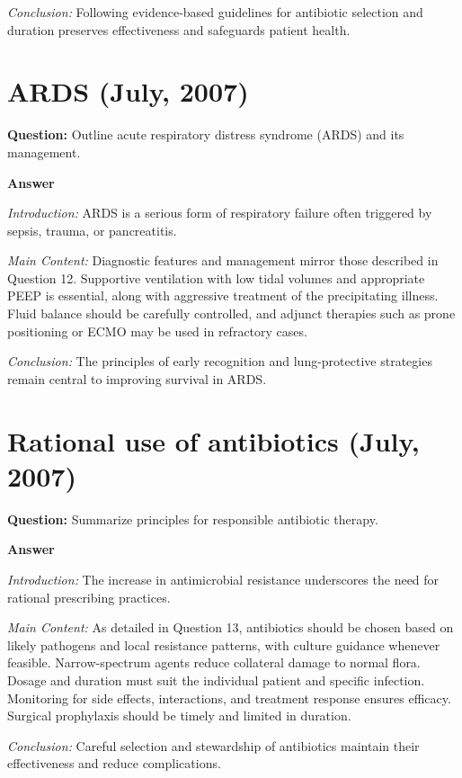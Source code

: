 \documentclass{article}
\begin{document}
\emph{Conclusion:} Following evidence-based guidelines for antibiotic selection and duration preserves effectiveness and safeguards patient health.


\section{ARDS (July, 2007)}


\textbf{Question:} Outline acute respiratory distress syndrome (ARDS) and its management.

\textbf{Answer}

\emph{Introduction:} ARDS is a serious form of respiratory failure often triggered by sepsis, trauma, or pancreatitis.

\emph{Main Content:} Diagnostic features and management mirror those described in Question 12. Supportive ventilation with low tidal volumes and appropriate PEEP is essential, along with aggressive treatment of the precipitating illness. Fluid balance should be carefully controlled, and adjunct therapies such as prone positioning or ECMO may be used in refractory cases.

\emph{Conclusion:} The principles of early recognition and lung-protective strategies remain central to improving survival in ARDS.


\section{Rational use of antibiotics (July, 2007)}


\textbf{Question:} Summarize principles for responsible antibiotic therapy.

\textbf{Answer}

\emph{Introduction:} The increase in antimicrobial resistance underscores the need for rational prescribing practices.

\emph{Main Content:} As detailed in Question 13, antibiotics should be chosen based on likely pathogens and local resistance patterns, with culture guidance whenever feasible. Narrow-spectrum agents reduce collateral damage to normal flora. Dosage and duration must suit the individual patient and specific infection. Monitoring for side effects, interactions, and treatment response ensures efficacy. Surgical prophylaxis should be timely and limited in duration.

\emph{Conclusion:} Careful selection and stewardship of antibiotics maintain their effectiveness and reduce complications.
\end{document}
